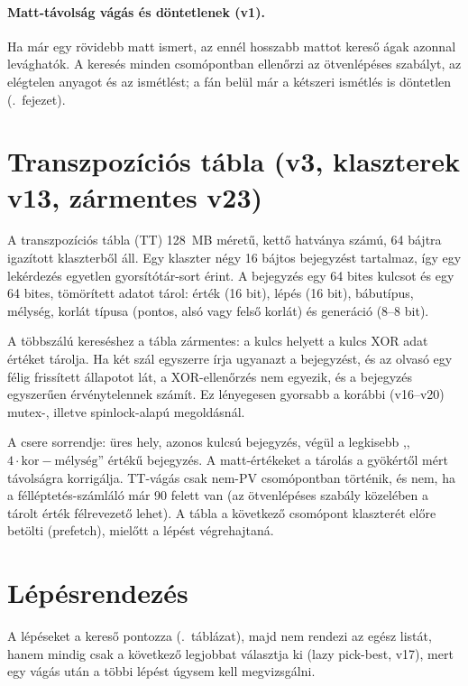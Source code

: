 \paragraph{Matt-távolság vágás és döntetlenek (v1).} Ha már egy rövidebb matt ismert, az ennél hosszabb mattot kereső ágak azonnal levághatók. A keresés minden csomópontban ellenőrzi az ötvenlépéses szabályt, az elégtelen anyagot és az ismétlést; a fán belül már a kétszeri ismétlés is döntetlen (.~fejezet).

\section{Transzpozíciós tábla (v3, klaszterek v13, zármentes v23)}

A transzpozíciós tábla (TT) 128~MB méretű, kettő hatványa számú, 64 bájtra igazított klaszterből áll. Egy klaszter négy 16 bájtos bejegyzést tartalmaz, így egy lekérdezés egyetlen gyorsítótár-sort érint. A bejegyzés egy 64 bites kulcsot és egy 64 bites, tömörített adatot tárol: érték (16 bit), lépés (16 bit), bábutípus, mélység, korlát típusa (pontos, alsó vagy felső korlát) és generáció (8--8 bit).

A többszálú kereséshez a tábla zármentes: a kulcs helyett a kulcs XOR adat értéket tárolja. Ha két szál egyszerre írja ugyanazt a bejegyzést, és az olvasó egy félig frissített állapotot lát, a XOR-ellenőrzés nem egyezik, és a bejegyzés egyszerűen érvénytelennek számít. Ez lényegesen gyorsabb a korábbi (v16--v20) mutex-, illetve spinlock-alapú megoldásnál.

A csere sorrendje: üres hely, azonos kulcsú bejegyzés, végül a legkisebb ,,$4\cdot\text{kor} - \text{mélység}$'' értékű bejegyzés. A matt-értékeket a tárolás a gyökértől mért távolságra korrigálja. TT-vágás csak nem-PV csomópontban történik, és nem, ha a félléptetés-számláló már 90 felett van (az ötvenlépéses szabály közelében a tárolt érték félrevezető lehet). A tábla a következő csomópont klaszterét előre betölti (prefetch), mielőtt a lépést végrehajtaná.

\section{Lépésrendezés}

A lépéseket a kereső pontozza (.~táblázat), majd nem rendezi az egész listát, hanem mindig csak a következő legjobbat választja ki (lazy pick-best, v17), mert egy vágás után a többi lépést úgysem kell megvizsgálni.

